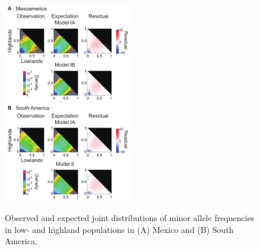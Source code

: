 \begin{figure}[tb]   
  \begin{center}
   \vspace{-0mm}
   \includegraphics[width=0.5\textwidth]{fig/Fig4}
   \renewcommand{\baselinestretch}{0.9}
   \vspace{-3mm}
   \caption{Observed and expected joint distributions of minor allele frequencies in low- and highland populations in (A) Mexico and (B) South America. }
\vspace{-6mm}
    \label{JFD}
  \end{center}
\end{figure}

